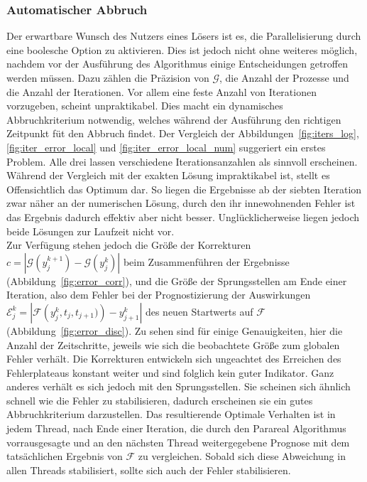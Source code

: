 \subsubsection*{Automatischer Abbruch}
Der erwartbare Wunsch des Nutzers eines Lösers ist es, die Parallelisierung durch eine boolesche Option zu aktivieren. Dies ist jedoch nicht ohne weiteres möglich, nachdem vor der Ausführung des Algorithmus einige Entscheidungen getroffen werden müssen. Dazu zählen die Präzision von \(\mathcal{G}\), die Anzahl der Prozesse und die Anzahl der Iterationen. Vor allem eine feste Anzahl von Iterationen vorzugeben, scheint unpraktikabel. Dies macht ein dynamisches Abbruchkriterium notwendig, welches während der Ausführung den richtigen Zeitpunkt füt den Abbruch findet. Der Vergleich der Abbildungen~\ref{fig:iters_log}, \ref{fig:iter_error_local} und \ref{fig:iter_error_local_num} suggeriert ein erstes Problem. Alle drei lassen verschiedene Iterationsanzahlen als sinnvoll erscheinen. Während der Vergleich mit der exakten Lösung impraktikabel ist, stellt es Offensichtlich das Optimum dar. So liegen die Ergebnisse ab der siebten Iteration zwar näher an der numerischen Lösung, durch den ihr innewohnenden Fehler ist das Ergebnis dadurch effektiv aber nicht besser. Unglücklicherweise liegen jedoch beide Lösungen zur Laufzeit nicht vor.\\

Zur Verfügung stehen jedoch die Größe der Korrekturen \(c = |\mathcal{G}\!\!\left(y_j^{k+1}\right)-\mathcal{G}\!\!\left(y_j^{k}\right)|\) beim Zusammenführen der Ergebnisse (Abbildung~\ref{fig:error_corr}), und die Größe der Sprungsstellen am Ende einer Iteration, also dem Fehler bei der Prognostizierung der Auswirkungen \(\mathcal{E}_{j}^k = \left|\mathcal{F}\!\!\left(y_j^{k}, t_j, t_{j+1})\right) - y_{j+1}^k\right|\) des neuen Startwerts auf \(\mathcal{F}\)(Abbildung~\ref{fig:error_disc}). Zu sehen sind für einige Genauigkeiten, hier die Anzahl der Zeitschritte, jeweils wie sich die beobachtete Größe zum globalen Fehler verhält. Die Korrekturen entwickeln sich ungeachtet des Erreichen des Fehlerplateaus konstant weiter und sind folglich kein guter Indikator. Ganz anderes verhält es sich jedoch mit den Sprungsstellen. Sie scheinen sich ähnlich schnell wie die Fehler zu stabilisieren, dadurch erscheinen sie ein gutes Abbruchkriterium darzustellen. Das resultierende Optimale Verhalten ist in jedem Thread, nach Ende einer Iteration, die durch den Parareal Algorithmus vorrausgesagte und an den nächsten Thread weitergegebene Prognose mit dem tatsächlichen Ergebnis von \(\mathcal{F}\) zu vergleichen. Sobald sich diese Abweichung in allen Threads stabilisiert, sollte sich auch der Fehler stabilisieren.

